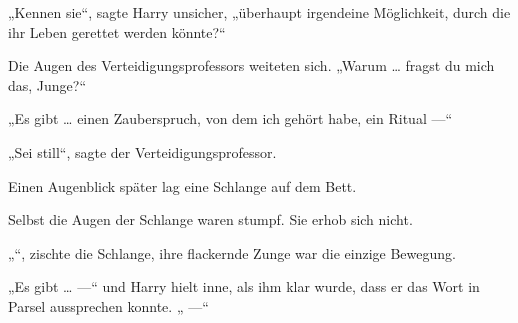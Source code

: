 „Kennen sie“, sagte Harry unsicher, „überhaupt irgendeine Möglichkeit, durch die ihr Leben gerettet werden könnte?“

Die Augen des Verteidigungsprofessors weiteten sich.
„Warum … fragst du mich das, Junge?“

„Es gibt … einen Zauberspruch, von dem ich gehört habe, ein Ritual —“

„Sei still“, sagte der Verteidigungsprofessor.

Einen Augenblick später lag eine Schlange auf dem Bett.

Selbst die Augen der Schlange waren stumpf. Sie erhob sich nicht.

„“, zischte die Schlange, ihre flackernde Zunge war die einzige Bewegung.

„Es gibt …  —“ und Harry hielt inne, als ihm klar wurde, dass er das Wort in Parsel aussprechen konnte.
„ —“

